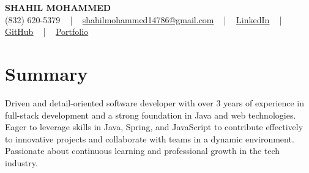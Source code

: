 \documentclass[letterpaper,10pt]{article}
\begin{document}
\begin{center}
    {\fontsize{14pt}{12pt}\selectfont \textbf{\MakeUppercase{Shahil Mohammed}}}\\ \vspace{2pt}
    \fontsize{10pt}{12pt}\selectfont (832) 620-5379 ~ | ~ \href{mailto:shahilmohammed14786@gmail.com}{shahilmohammed14786@gmail.com} ~ | ~  
    \href{https://www.linkedin.com/in/shahil-mohammed-9652931a1/}{\color{blue}\underline{LinkedIn}}  ~ | ~ 
    \href{https://github.com/freakbeast14}{\color{blue}\underline{GitHub}} ~ | ~ 
    \href{https://shahil-mohammed.netlify.app/}{\color{blue}\underline{Portfolio}}
    \vspace{-8pt}
\end{center}

\section{Summary}
\vspace{-2pt}\fontsize{8pt}{9pt}\selectfont
Driven and detail-oriented software developer with over 3 years of experience in full-stack development and a strong foundation in Java and web technologies. Eager to leverage skills in Java, Spring, and JavaScript to contribute effectively to innovative projects and collaborate with teams in a dynamic environment. Passionate about continuous learning and professional growth in the tech industry.
 \vspace{-5pt}
 
\vspace{-2pt}
\end{document}
